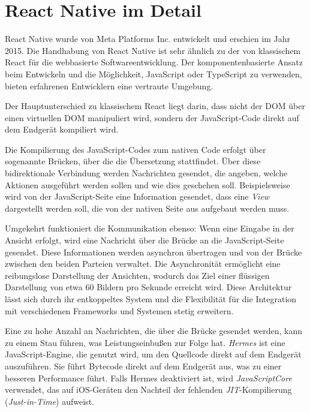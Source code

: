 \section{React Native im Detail}
React Native wurde von Meta Platforms Inc. entwickelt und erschien im Jahr 2015. Die Handhabung von React Native ist sehr ähnlich zu der von klassischem React für die webbasierte Softwareentwicklung. Der komponentenbasierte Ansatz beim Entwickeln und die Möglichkeit, JavaScript oder TypeScript zu verwenden, bieten erfahrenen Entwicklern eine vertraute Umgebung. 

\vspace{0.5cm}

Der Hauptunterschied zu klassischem React liegt darin, dass nicht der DOM über einen virtuellen DOM manipuliert wird, sondern der JavaScript-Code direkt auf dem Endgerät kompiliert wird.

\vspace{0.5cm}

Die Kompilierung des JavaScript-Codes zum nativen Code erfolgt über sogenannte Brücken, über die die Übersetzung stattfindet. Über diese bidirektionale Verbindung werden Nachrichten gesendet, die angeben, welche Aktionen ausgeführt werden sollen und wie dies geschehen soll. Beispielsweise wird von der JavaScript-Seite eine Information gesendet, dass eine \textit{View} dargestellt werden soll, die von der nativen Seite aus aufgebaut werden muss. 

\vspace{0.5cm}

Umgekehrt funktioniert die Kommunikation ebenso: Wenn eine Eingabe in der Ansicht erfolgt, wird eine Nachricht über die Brücke an die JavaScript-Seite gesendet. Diese Informationen werden asynchron übertragen und von der Brücke zwischen den beiden Parteien verwaltet. Die Asynchronität ermöglicht eine reibungslose Darstellung der Ansichten, wodurch das Ziel einer flüssigen Darstellung von etwa 60 Bildern pro Sekunde erreicht wird. Diese Architektur lässt sich durch ihr entkoppeltes System und die Flexibilität für die Integration mit verschiedenen Frameworks und Systemen stetig erweitern.

\vspace{0.5cm}

Eine zu hohe Anzahl an Nachrichten, die über die Brücke gesendet werden, kann zu einem Stau führen, was Leistungseinbußen zur Folge hat. \textit{Hermes} ist eine JavaScript-Engine, die genutzt wird, um den Quellcode direkt auf dem Endgerät auszuführen. Sie führt Bytecode direkt auf dem Endgerät aus, was zu einer besseren Performance führt. Falls Hermes deaktiviert ist, wird \textit{JavaScriptCore} verwendet, das auf iOS-Geräten den Nachteil der fehlenden \textit{JIT}-Kompilierung (\textit{Just-in-Time}) aufweist. 

